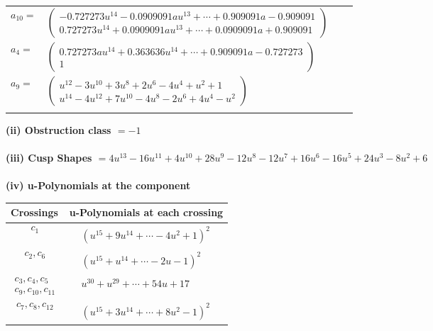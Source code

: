 \documentclass[1p]{elsarticle_modified}
\theoremstyle{definition}
\begin{document}
\begin{tabular}{m{7pt} m{180pt} m{7pt} m{180pt} }
\flushright $a_{10}=$&$\begin{pmatrix}-0.727273 u^{14}-0.0909091 a u^{13}+\cdots+0.909091 a-0.909091\\0.727273 u^{14}+0.0909091 a u^{13}+\cdots+0.0909091 a+0.909091\end{pmatrix}$ \\
\flushright $a_{4}=$&$\begin{pmatrix}0.727273 a u^{14}+0.363636 u^{14}+\cdots+0.909091 a-0.727273\\1\end{pmatrix}$ \\
\flushright $a_{9}=$&$\begin{pmatrix}u^{12}-3 u^{10}+3 u^8+2 u^6-4 u^4+u^2+1\\u^{14}-4 u^{12}+7 u^{10}-4 u^8-2 u^6+4 u^4- u^2\end{pmatrix}$\\&\end{tabular}
\flushleft \textbf{(ii) Obstruction class $= -1$}\\~\\
\flushleft \textbf{(iii) Cusp Shapes $= 4 u^{13}-16 u^{11}+4 u^{10}+28 u^9-12 u^8-12 u^7+16 u^6-16 u^5+24 u^3-8 u^2+6$}\\~\\
\newpage\renewcommand{\arraystretch}{1}
\flushleft \textbf{(iv) u-Polynomials at the component}\newline \\
\begin{tabular}{m{50pt}|m{274pt}}
Crossings & \hspace{64pt}u-Polynomials at each crossing \\
\hline $$\begin{aligned}c_{1}\end{aligned}$$&$\begin{aligned}
&(u^{15}+9 u^{14}+\cdots-4 u^2+1)^{2}
\end{aligned}$\\
\hline $$\begin{aligned}c_{2},c_{6}\end{aligned}$$&$\begin{aligned}
&(u^{15}+u^{14}+\cdots-2 u-1)^{2}
\end{aligned}$\\
\hline $$\begin{aligned}c_{3},c_{4},c_{5}\\c_{9},c_{10},c_{11}\end{aligned}$$&$\begin{aligned}
&u^{30}+u^{29}+\cdots+54 u+17
\end{aligned}$\\
\hline $$\begin{aligned}c_{7},c_{8},c_{12}\end{aligned}$$&$\begin{aligned}
&(u^{15}+3 u^{14}+\cdots+8 u^2-1)^{2}
\end{aligned}$\\
\hline
\end{tabular}\\~\\
\end{document}
